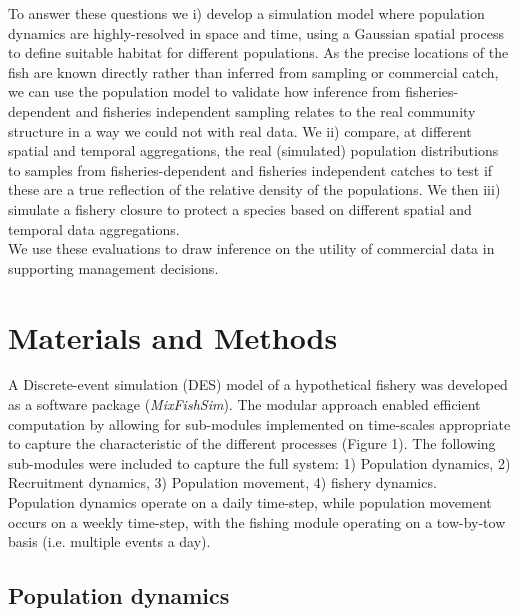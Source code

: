 \documentclass[review]{elsarticle}
\begin{document}
To answer these questions we i) develop a simulation model where population
dynamics are highly-resolved in space and time, using a Gaussian spatial
process to define suitable habitat for different populations. As the precise
locations of the fish are known directly rather than inferred from sampling
or commercial catch, we can use the population model to validate how inference
from fisheries-dependent and fisheries independent sampling relates to the real
community structure in a way we could not with real data. We ii) compare, at
different spatial and temporal aggregations, the real (simulated) population
distributions to samples from fisheries-dependent and fisheries independent
catches to test if these are a true reflection of the relative density of the
populations. We then iii) simulate a fishery closure to protect a species based
on different spatial and temporal data aggregations. \\

We use these evaluations to draw inference on the utility of commercial data in
supporting management decisions.  

\section{Materials and Methods}

A Discrete-event simulation (DES) model of a hypothetical fishery was developed
as a software package (\textit{MixFishSim}). The modular approach enabled
efficient computation by allowing for sub-modules implemented on time-scales
appropriate to capture the characteristic of the different processes (Figure
1). The following sub-modules were included to capture the full system: 1)
Population dynamics, 2) Recruitment dynamics, 3) Population movement, 4)
fishery dynamics.\\

Population dynamics operate on a daily time-step, while population movement
occurs on a weekly time-step, with the fishing module operating on a tow-by-tow
basis (i.e.  multiple events a day). 

\subsection{Population dynamics}
\end{document}
